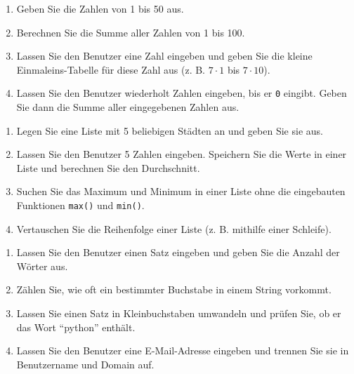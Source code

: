 \documentclass[11pt, a4paper, oneside]{article}
\begin{document}
	\pagebreak
	
	
	\begin{enumerate}[label=\alph*)]
		\item Geben Sie die Zahlen von 1 bis 50 aus.
		\item Berechnen Sie die Summe aller Zahlen von 1 bis 100.
		\item Lassen Sie den Benutzer eine Zahl eingeben und geben Sie die kleine Einmaleins-Tabelle für diese Zahl aus (z. B. $7 \cdot 1$ bis $7 \cdot 10$).
		\item Lassen Sie den Benutzer wiederholt Zahlen eingeben, bis er \texttt{0} eingibt. Geben Sie dann die Summe aller eingegebenen Zahlen aus.
	\end{enumerate}
	
	
	\begin{enumerate}[label=\alph*)]
		\item Legen Sie eine Liste mit 5 beliebigen Städten an und geben Sie sie aus.
		\item Lassen Sie den Benutzer 5 Zahlen eingeben. Speichern Sie die Werte in einer Liste und berechnen Sie den Durchschnitt.
		\item Suchen Sie das Maximum und Minimum in einer Liste ohne die eingebauten Funktionen \texttt{max()} und \texttt{min()}.
		\item Vertauschen Sie die Reihenfolge einer Liste (z. B. mithilfe einer Schleife).
	\end{enumerate}
	
	
	\begin{enumerate}[label=\alph*)]
		\item Lassen Sie den Benutzer einen Satz eingeben und geben Sie die Anzahl der Wörter aus.
		\item Zählen Sie, wie oft ein bestimmter Buchstabe in einem String vorkommt.
		\item Lassen Sie einen Satz in Kleinbuchstaben umwandeln und prüfen Sie, ob er das Wort ``python'' enthält.
		\item Lassen Sie den Benutzer eine E-Mail-Adresse eingeben und trennen Sie sie in Benutzername und Domain auf.
	\end{enumerate}
	
	
\end{document}
